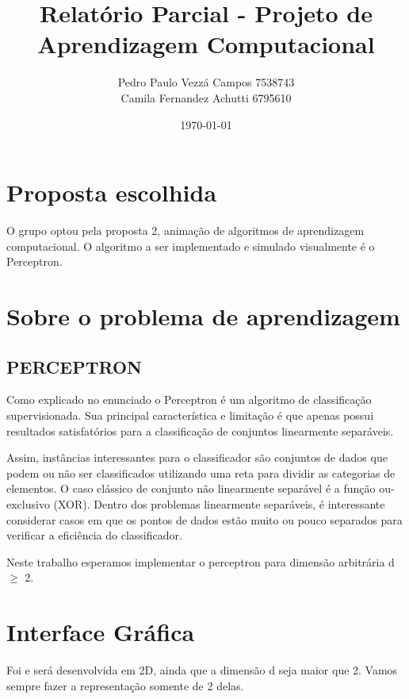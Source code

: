 \documentclass[brazil, a4paper]{article}
\begin{document}
\title{Relatório Parcial - Projeto de Aprendizagem Computacional}
\author{Pedro Paulo Vezzá Campos \hfill 7538743\\
		Camila Fernandez Achutti \hfill 6795610}
\date{\today}

\maketitle



\section{Proposta escolhida}
O grupo optou pela proposta 2, animação de algoritmos de aprendizagem
computacional. O algoritmo a ser implementado e simulado visualmente é o
Perceptron.

\section{Sobre o problema de aprendizagem}
\subsection{PERCEPTRON}
Como explicado no enunciado o Perceptron é um algoritmo de classificação 
supervisionada. Sua principal característica e limitação é que apenas possui 
resultados satisfatórios para a classificação de conjuntos linearmente
separáveis.

Assim, instâncias interessantes para o classificador são conjuntos de dados que
podem ou não ser classificados utilizando uma reta para dividir as categorias
de elementos. O caso clássico de conjunto não linearmente separável é a
função ou-exclusivo (XOR). Dentro dos problemas linearmente separáveis,
é interessante considerar casos em que os pontos de dados estão muito ou
pouco separados para verificar a eficiência do classificador.

Neste trabalho esperamos implementar o perceptron para dimensão arbitrária d $\ge$ 2.

\section{Interface Gráfica}

Foi e será desenvolvida em 2D, ainda que a dimensão d seja maior que 2. Vamos sempre fazer a representação somente de 2 delas. 
\end{document}
